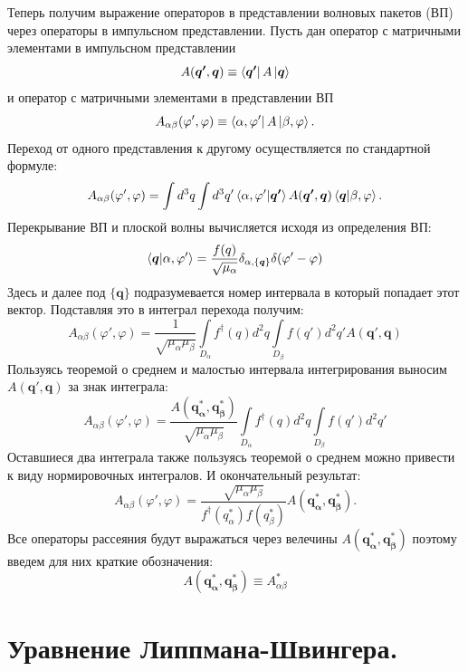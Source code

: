 \documentclass[a4paper,12pt]{article}
\newcommand{\vect}[1]{\boldsymbol{#1}}
\begin{document}
Теперь получим выражение операторов в представлении волновых пакетов (ВП) через операторы в импульсном представлении. Пусть дан оператор с матричными элементами в импульсном представлении
\[
	A(\vect{q'},\vect{q}) \equiv \bra{\vect{q'}}A\ket{\vect{q}}
\] и оператор с матричными элементами в представлении ВП \[
  A_{\alpha\beta}(\varphi',\varphi) \equiv \bra{\alpha,\varphi'}A\ket{\beta,\varphi}.
\]
Переход от одного представления к другому осуществляется по стандартной формуле:
\[
	A_{\alpha\beta}(\varphi',\varphi) = \int d^3q \int d^3q' \braket{\alpha,\varphi'|\vect{q'}} A(\vect{q'},\vect{q}) \braket{\vect{q}|\beta,\varphi}.
\] 
Перекрывание ВП и плоской волны вычисляется исходя из определения ВП:
\[
 \braket{\vect{q}|\alpha,\varphi'} = \frac{f(q)}{\sqrt{\mu_\alpha}} \delta_{\alpha,\{\vect{q}\}} \delta(\varphi'-\varphi)
\]
Здесь и далее под $\{\vect{q}\}$ подразумевается номер интервала в который попадает этот вектор. Подставляя это в интеграл перехода получим:
\[
 A_{\alpha\beta}(\varphi',\varphi) = \frac{1}{\sqrt{\mu_\alpha \mu_\beta}} \int\limits_{D_\alpha} f^\dagger(q) d^2q \int\limits_{D_\beta} f(q') d^2q' A(\vect{q'},\vect{q})
\] Пользуясь теоремой о среднем и малостью интервала интегрирования выносим $A(\vect{q'},\vect{q})$ за знак интеграла:
\[
 A_{\alpha\beta}(\varphi',\varphi) = \frac{A(\vect{q^*_\alpha},\vect{q^*_\beta})}{\sqrt{\mu_\alpha \mu_\beta}} \int\limits_{D_\alpha} f^\dagger(q) d^2q \int\limits_{D_\beta} f(q') d^2q'
\] Оставшиеся два интеграла также пользуясь теоремой о среднем можно привести к виду нормировочных интегралов. И окончательный результат:
\[
 A_{\alpha\beta}(\varphi',\varphi) = \frac{\sqrt{\mu_\alpha \mu_\beta}}{ f^\dagger(q_\alpha^*)f(q_\beta^*) }  A(\vect{q^*_\alpha},\vect{q^*_\beta}).
\]
Все операторы рассеяния будут выражаться через велечины $A(\vect{q^*_\alpha},\vect{q^*_\beta})$ поэтому введем для них краткие обозначения:
\begin{equation}
    \label{mesh_oper}
    A(\vect{q^*_\alpha},\vect{q^*_\beta}) \equiv A^*_{\alpha\beta}
\end{equation}




\newline
\section{Уравнение Липпмана-Швингера.}
\end{document}
